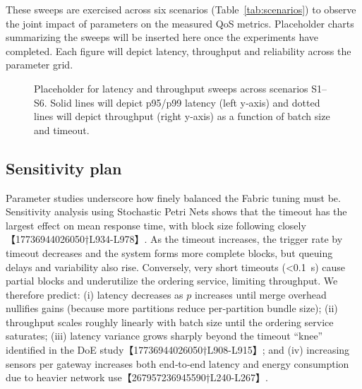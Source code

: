 \documentclass[12pt,onecolumn]{IEEEtran} %
\begin{document}
These sweeps are exercised across six scenarios (Table~\ref{tab:scenarios}) to observe the joint impact of parameters on the measured QoS metrics.  Placeholder charts summarizing the sweeps will be inserted here once the experiments have completed.  Each figure will depict latency, throughput and reliability across the parameter grid.

\begin{figure}[!t]
  \centering
  \fbox{\rule{0pt}{1.75in}\rule{0.95\linewidth}{0pt}} %
  \caption{Placeholder for latency and throughput sweeps across scenarios S1–S6.  Solid lines will depict p95/p99 latency (left y‑axis) and dotted lines will depict throughput (right y‑axis) as a function of batch size and timeout.}
  \label{fig:sweep-results}
\end{figure}

\subsection{Sensitivity plan}
\label{sec:sensitivity}
Parameter studies underscore how finely balanced the Fabric tuning must be.  Sensitivity analysis using Stochastic Petri Nets shows that the timeout has the largest effect on mean response time, with block size following closely【17736944026050†L934-L978】.  As the timeout increases, the trigger rate by timeout decreases and the system forms more complete blocks, but queuing delays and variability also rise.  Conversely, very short timeouts (<0.1~s) cause partial blocks and underutilize the ordering service, limiting throughput.  We therefore predict: (i) latency decreases as $p$ increases until merge overhead nullifies gains (because more partitions reduce per‑partition bundle size); (ii) throughput scales roughly linearly with batch size until the ordering service saturates; (iii) latency variance grows sharply beyond the timeout “knee” identified in the DoE study【17736944026050†L908-L915】; and (iv) increasing sensors per gateway increases both end‑to‑end latency and energy consumption due to heavier network use【267957236945590†L240-L267】.
\end{document}
